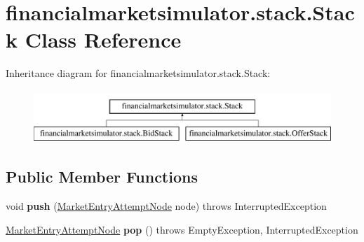 \hypertarget{classfinancialmarketsimulator_1_1stack_1_1_stack}{\section{financialmarketsimulator.\+stack.\+Stack Class Reference}
\label{classfinancialmarketsimulator_1_1stack_1_1_stack}
}
Inheritance diagram for financialmarketsimulator.\+stack.\+Stack\+:\begin{figure}[H]
\begin{center}
\leavevmode
\includegraphics[height=2.000000cm]{classfinancialmarketsimulator_1_1stack_1_1_stack}
\end{center}
\end{figure}
\subsection*{Public Member Functions}
\begin{DoxyCompactItemize}
\item 
\hypertarget{classfinancialmarketsimulator_1_1stack_1_1_stack_a923eeb3696e2bbb208516defd3039213}{void {\bfseries push} (\hyperlink{classfinancialmarketsimulator_1_1stack_1_1_market_entry_attempt_node}{Market\+Entry\+Attempt\+Node} node)  throws Interrupted\+Exception }\label{classfinancialmarketsimulator_1_1stack_1_1_stack_a923eeb3696e2bbb208516defd3039213}

\item 
\hypertarget{classfinancialmarketsimulator_1_1stack_1_1_stack_acf0de0447fa83242a8409bc5903ca215}{\hyperlink{classfinancialmarketsimulator_1_1stack_1_1_market_entry_attempt_node}{Market\+Entry\+Attempt\+Node} {\bfseries pop} ()  throws Empty\+Exception, Interrupted\+Exception }\label{classfinancialmarketsimulator_1_1stack_1_1_stack_acf0de0447fa83242a8409bc5903ca215}

\end{DoxyCompactItemize}
